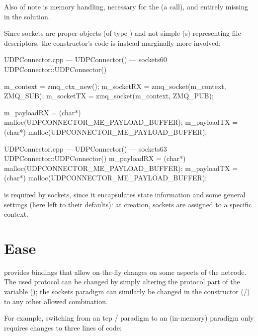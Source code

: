 \FLOATnoindent Also of note is memory handling, necessary for the   (a  call), and entirely missing in the  solution.

Since  sockets are proper objects (of type ) and not simple (s) representing file descriptors, the constructor's code is instead marginally more involved:

\begin{codelist}{UDPConnector.cpp --- UDPConnector() ---  sockets}{60}
UDPConnector::UDPConnector() {
	m_context  = zmq_ctx_new();
	m_socketRX = zmq_socket(m_context, ZMQ_SUB);
	m_socketTX = zmq_socket(m_context, ZMQ_PUB);

	m_payloadRX = (char*) malloc(UDPCONNECTOR_ME_PAYLOAD_BUFFER);
	m_payloadTX = (char*) malloc(UDPCONNECTOR_ME_PAYLOAD_BUFFER);
}
\end{codelist}

\begin{codelist}{UDPConnector.cpp --- UDPConnector() ---  sockets}{63}
UDPConnector::UDPConnector() {
	m_payloadRX = (char*) malloc(UDPCONNECTOR_ME_PAYLOAD_BUFFER);
	m_payloadTX = (char*) malloc(UDPCONNECTOR_ME_PAYLOAD_BUFFER);
}
\end{codelist} %

\FLOATnoindent {} is required by  sockets, since it encapsulates state information and some general settings (here left to their defaults): at creation, sockets are assigned to a specific context.

\section{Ease}\label{sc:code:ease}

 provides bindings that allow on-the-fly changes on some aspects of the netcode. The used protocol can be changed by simply altering the protocol part of the  variable (); the sockets paradigm can similarly be changed in the constructor (/) to any other allowed combination.

For example, switching from an \gls{tcp} / paradigm to an  (in-memory)  paradigm only requires changes to three lines of code:

